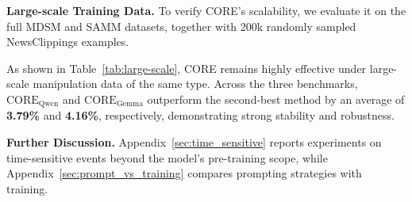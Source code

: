 \documentclass{article}
\theoremstyle{plain}
\theoremstyle{definition}
\theoremstyle{remark}
\begin{document}
\noindent\textbf{Large-scale Training Data.}
To verify CORE's scalability, we evaluate it on the full MDSM and SAMM datasets, together with 200k randomly sampled NewsClippings examples.

As shown in Table~\ref{tab:large-scale}, CORE remains highly effective under large-scale manipulation data of the same type. Across the three benchmarks, $\text{CORE}_\text{Qwen}$ and $\text{CORE}_\text{Gemma}$ outperform the second-best method by an average of \textbf{3.79\%} and \textbf{4.16\%}, respectively, demonstrating strong stability and robustness.

\noindent\textbf{Further Discussion.}
Appendix~\ref{sec:time_sensitive} reports experiments on time-sensitive events beyond the model's pre-training scope, while Appendix~\ref{sec:prompt_vs_training} compares prompting strategies with  training.
\end{document}
